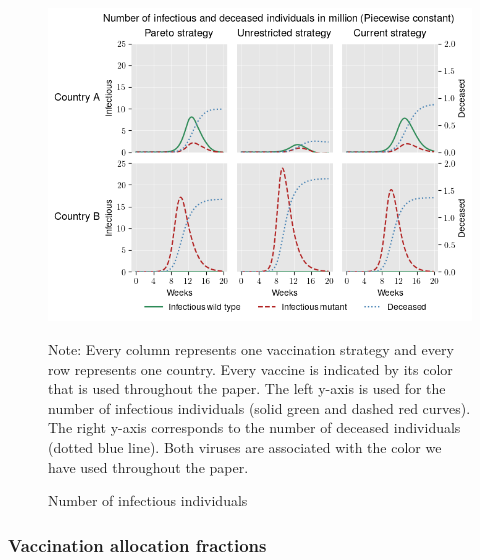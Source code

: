 \begin{figure}[h!]
\centering
\includegraphics[scale=0.65]{images/piecewise_infectious_dead.png}\\
\begin{flushleft}
\scriptsize{Note:} Every column represents one vaccination strategy and every row represents one country. Every vaccine is indicated by its color that is used throughout the paper. The left y-axis is used for the number of infectious individuals (solid green and dashed red curves). The right y-axis corresponds to the number of deceased individuals (dotted blue line). Both viruses are associated with the color we have used throughout the paper. 
\end{flushleft}
\caption{Number of infectious individuals}
\label{fig:results_piecewise_infectious_dead}
\end{figure}

\clearpage
\subsubsection{Vaccination allocation fractions}
\label{A:fractions}

